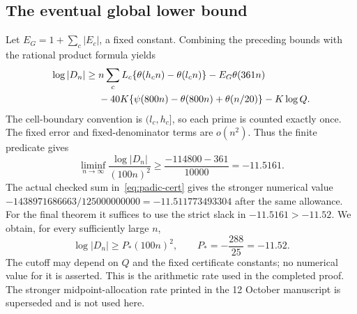 \subsection{The eventual global lower bound}
Let $E_G=1+\sum_c|E_c|$, a fixed constant. Combining the preceding
bounds with the rational product formula yields
\begin{align}
 \log|D_n|\ge{}&n\sum_c L_c\{\theta(h_cn)-\theta(l_cn)\}
                   -E_G\theta(361n)\notag\\
 &-40K\{\psi(800n)-\theta(800n)+\theta(n/20)\}
                   -K\log Q.\label{eq:global-log-bound}
\end{align}
The cell-boundary convention is $(l_c,h_c]$, so each prime is counted
exactly once. The fixed error and fixed-denominator terms are $o(n^2)$.
Thus the finite predicate gives
\begin{equation}\label{eq:prime-liminf}
 \liminf_{n\to\infty}\frac{\log|D_n|}{(100n)^2}
 \ge\frac{-114800-361}{10000}=-11.5161.
\end{equation}
The actual checked sum in~\eqref{eq:padic-cert} gives the stronger numerical
value $-1438971686663/125000000000=-11.511773493304$ after the same allowance.
For the final theorem it suffices to use the strict slack in
$-11.5161>-11.52$. We obtain, for every sufficiently large $n$,
\begin{equation}\label{eq:P-certified}
 \log|D_n|\ge P_*(100n)^2,\qquad P_*=-\frac{288}{25}=-11.52.
\end{equation}
The cutoff may depend on $Q$ and the fixed certificate constants; no
numerical value for it is asserted. This is the arithmetic rate used in
the completed proof. The stronger midpoint-allocation rate printed in
the 12 October manuscript is superseded and is not used here.
